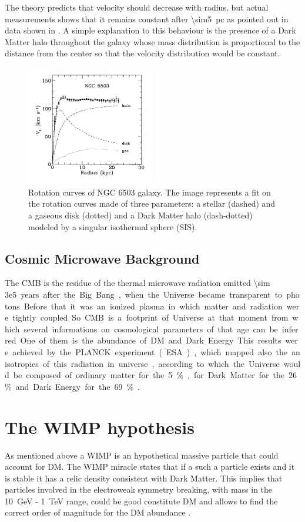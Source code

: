 The theory predicts that velocity should decrease with radius, but actual measurements shows that it remains constant after \SI{\sim5}{pc} as pointed out in data shown in \Fig{\ref{fig:rotation}}. A simple explanation to this behaviour is the presence of a Dark Matter halo throughout the galaxy whose mass distribution is proportional to the distance from the center so that the velocity distribution would be constant.
\begin{figure}[pt]
\centering
\includegraphics[width=0.5\textwidth]{DarkMatter/Rotationcurves}
\caption{Rotation curves of NGC 6503 galaxy. The image represents a fit on the rotation curves made of three parameters: a stellar (dashed) and a gaseous disk (dotted) and a Dark Matter halo (dash-dotted) modeled by a singular isothermal sphere (SIS).}
\label{fig:rotation}
\end{figure}


\subsection{Cosmic Microwave Background}
The CMB is the residue of the thermal microwave radiation emitted \SI{\sim 3e5} years after the Big Bang, when the Universe became transparent to photons. Before that it was an ionized plasma in which matter and radiation were tightly coupled. So CMB is a footprint of Universe at that moment from which several informations on cosmological parameters of that age can be inferred. One of them is the abundance of DM and Dark Energy. This results were achieved by the PLANCK experiment (ESA), which mapped also the anisotropies of this radiation in universe, according to which the Universe would be composed of ordinary matter for the 5\%, for Dark Matter for the 26\% and Dark Energy for the 69\% \cite{Planck:results}.

\section{The WIMP hypothesis}
\label{sec:wimp}
As mentioned above a WIMP is an hypothetical massive particle that could account for DM. The WIMP miracle states that if a such a particle exists and it is stable it has a relic density consistent with Dark Matter. This implies that particles involved in the electroweak symmetry breaking, with mass in the \SI{10}{\GeV} - \SI{1}{\TeV} range, could be good constitute DM and allows to find the correct order of magnitude for the DM abundance \cite{DMcollider}.

